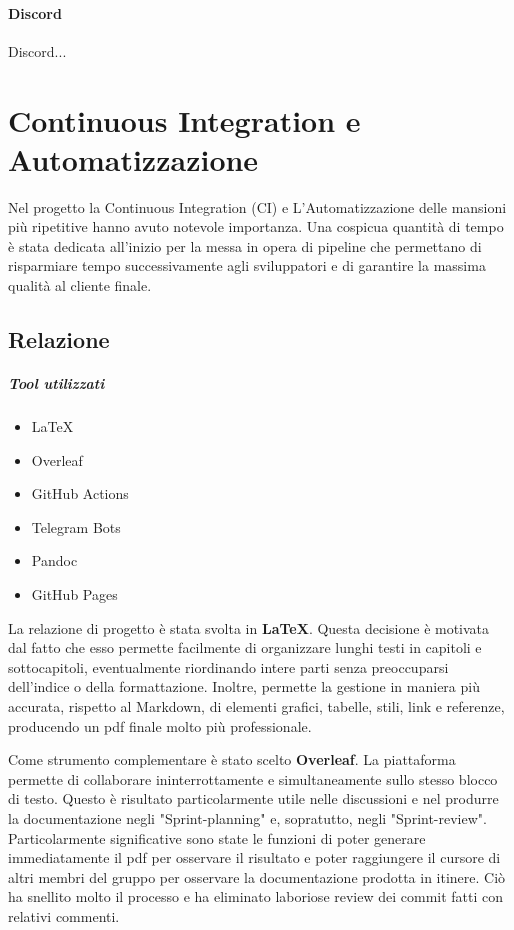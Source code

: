     \paragraph{Discord}
    Discord... 

\section{Continuous Integration e Automatizzazione}
\label{chap:CI}
Nel progetto la Continuous Integration (CI) e L'Automatizzazione delle mansioni più ripetitive hanno avuto notevole importanza. Una cospicua quantità di tempo è stata dedicata all'inizio per la messa in opera di pipeline che permettano di risparmiare tempo successivamente agli sviluppatori e di garantire la massima qualità al cliente finale.
    \subsection{Relazione}
        \subparagraph{Tool utilizzati}
        \begin{itemize}
            \item \LaTeX
            \item Overleaf
            \item GitHub Actions
            \item Telegram Bots
            \item Pandoc
            \item GitHub Pages
        \end{itemize}
        La relazione di progetto è stata svolta in \textbf{\LaTeX}. Questa decisione è motivata dal fatto che esso permette facilmente di organizzare lunghi testi in capitoli e sottocapitoli, eventualmente riordinando intere parti senza preoccuparsi dell'indice o della formattazione. Inoltre, permette la gestione in maniera più accurata, rispetto al Markdown, di elementi grafici, tabelle, stili, link e referenze, producendo un pdf finale molto più professionale. 
        
        Come strumento complementare è stato scelto \textbf{Overleaf}. La piattaforma permette di collaborare ininterrottamente e simultaneamente sullo stesso blocco di testo. Questo è risultato particolarmente utile nelle discussioni e nel produrre la documentazione negli "Sprint-planning" e, sopratutto, negli "Sprint-review". Particolarmente significative sono state le funzioni di poter generare immediatamente il pdf per osservare il risultato e poter raggiungere il cursore di altri membri del gruppo per osservare la documentazione prodotta in itinere. Ciò ha snellito molto il processo e ha eliminato laboriose review dei commit fatti con relativi commenti.  

